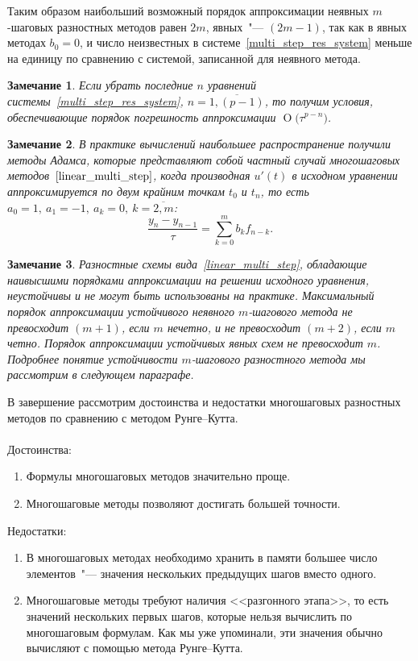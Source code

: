 \documentclass[11pt,a4paper,twoside,listtotoc,bibtotoc]{report}
\numberwithin{equation}{section}
\theoremstyle{definition}
\theoremstyle{plain}
\newtheorem{note}{Замечание}[section]
\newcommand{\bigO}[1]{\ensuremath{\operatorname{O}\bigl(#1\bigr)}}
\begin{document}
Таким образом наибольший возможный порядок аппроксимации неявных
$m$-шаговых разностных методов равен $2m$, явных~"--- $(2m-1)$,
так как в явных методах $b_0 = 0$, и число неизвестных
в системе~\eqref{multi_step_res_system} меньше на единицу по сравнению с
системой, записанной для неявного метода.
%
\begin{note}
%
    Если убрать последние $n$ уравнений системы~\eqref{multi_step_res_system},
    $n=\overline{1,(p-1)}$,
    то получим условия, обеспечивающие порядок погрешность аппроксимации
    $\bigO{\tau^{p-n}}$.
%
\end{note}
%
\begin{note}
%
    В практике вычислений наибольшее распространение получили
    методы Адамса, которые представляют собой частный случай многошаговых
    методов~$\eqref{linear_multi_step}$, когда производная $u'(t)$ в исходном уравнении
    аппроксимируется
    по двум крайним точкам $t_0$ и $t_n$, то есть
    $a_0=1,~a_1=-1,~a_k=0,~k=\overline{2,m}$:
    $$
        \frac{y_n-y_{n-1}}{\tau}=\sum_{k=0}^mb_kf_{n-k}.
    $$
%
\end{note}
%
\begin{note}
%
    Разностные схемы вида~\eqref{linear_multi_step}, обладающие наивысшими порядками аппроксимации
    на решении исходного уравнения, неустойчивы и не могут быть использованы
    на практике. Максимальный порядок аппроксимации устойчивого неявного $m$-шагового метода
    не превосходит $(m+1)$, если $m$ нечетно, и не превосходит $(m+2)$, если $m$ четно.
    Порядок аппроксимации устойчивых явных схем не превосходит $m$.
    Подробнее понятие устойчивости $m$-шагового разностного метода мы
    рассмотрим в следующем параграфе.
%
\end{note}
%

В завершение рассмотрим достоинства и недостатки многошаговых разностных
методов по сравнению с методом Рунге--Кутта.\\~\\
Достоинства:
%
\begin{enumerate}
%
    \item Формулы многошаговых методов значительно проще.
    \item Многошаговые методы позволяют достигать большей точности.
%
\end{enumerate}
%
Недостатки:
%
\begin{enumerate}
%
    \item В многошаговых методах необходимо хранить в памяти большее число элементов~"---
        значения нескольких предыдущих шагов вместо одного.
    \item Многошаговые методы требуют наличия <<разгонного этапа>>, то есть значений нескольких
        первых шагов, которые нельзя вычислить по многошаговым формулам. Как мы уже упоминали,
        эти значения обычно вычисляют с помощью метода Рунге--Кутта.
%
\end{enumerate}
%
\end{document}
